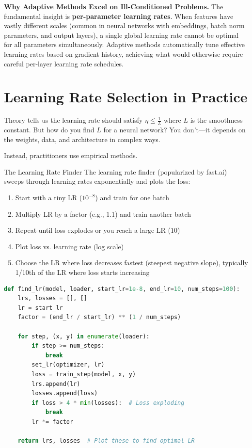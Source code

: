 \documentclass[../../main.tex]{subfiles}
\begin{document}
\begin{keyconcept}
\textbf{Why Adaptive Methods Excel on Ill-Conditioned Problems.}
The fundamental insight is \textbf{per-parameter learning rates}. When features have vastly different scales (common in neural networks with embeddings, batch norm parameters, and output layers), a single global learning rate cannot be optimal for all parameters simultaneously. Adaptive methods automatically tune effective learning rates based on gradient history, achieving what would otherwise require careful per-layer learning rate schedules.
\end{keyconcept}

\section{Learning Rate Selection in Practice}\label{sec:lr-finder}

Theory tells us the learning rate should satisfy $\eta \leq \frac{1}{L}$ where $L$ is the smoothness constant. But how do you find $L$ for a neural network? You don't---it depends on the weights, data, and architecture in complex ways.

Instead, practitioners use empirical methods.

\begin{principle}{The Learning Rate Finder}
The learning rate finder (popularized by fast.ai) sweeps through learning rates exponentially and plots the loss:
\begin{enumerate}
    \item Start with a tiny LR ($10^{-8}$) and train for one batch
    \item Multiply LR by a factor (e.g., 1.1) and train another batch
    \item Repeat until loss explodes or you reach a large LR ($10$)
    \item Plot loss vs. learning rate (log scale)
    \item Choose the LR where loss decreases fastest (steepest negative slope), typically 1/10th of the LR where loss starts increasing
\end{enumerate}
\end{principle}

\begin{lstlisting}[language=Python, caption={Learning rate finder pseudocode}]
def find_lr(model, loader, start_lr=1e-8, end_lr=10, num_steps=100):
    lrs, losses = [], []
    lr = start_lr
    factor = (end_lr / start_lr) ** (1 / num_steps)

    for step, (x, y) in enumerate(loader):
        if step >= num_steps:
            break
        set_lr(optimizer, lr)
        loss = train_step(model, x, y)
        lrs.append(lr)
        losses.append(loss)
        if loss > 4 * min(losses):  # Loss exploding
            break
        lr *= factor

    return lrs, losses  # Plot these to find optimal LR
\end{lstlisting}
\end{document}
